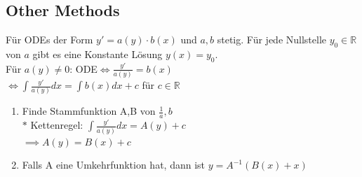 \subsection{Other Methods}
  Für ODEs der Form $y'=a(y)\cdot b(x)$ und $a,b$ stetig.
  Für jede Nullstelle $y_0\in\mathbb R$ von $a$ gibt es eine Konstante Lösung
  $y(x)=y_0$.\\
  Für $a(y)\neq0$: ODE$\iff \frac{y'}{a(y)}=b(x)$\\
  $\iff\int \frac{y'}{a(y)}dx=\int b(x)dx+c$ für $c\in\mathbb R$
  \begin{enumerate}
    \item Finde Stammfunktion A,B von $\frac{1}{a}, b$\\
    $*$ Kettenregel: $\int\frac{y'}{a(y)}dx = A(y)+c$\\
    $\implies A(y)=B(x) + c$
    \item Falls A eine Umkehrfunktion hat, dann ist $y=A^{-1}(B(x)+x)$
  \end{enumerate}

